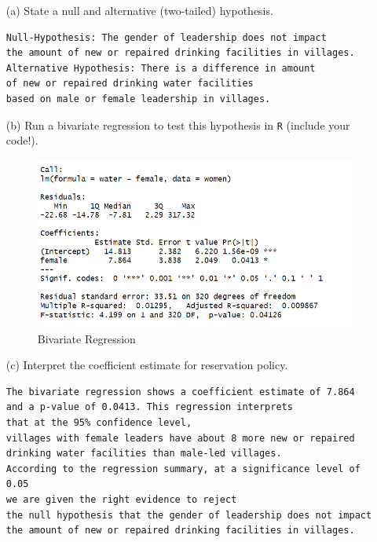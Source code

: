 \documentclass[12pt,letterpaper]{article}
\begin{document}
\newpage
\begin{enumerate}
	\item [(a)] State a null and alternative (two-tailed) hypothesis. 
\begin{Verbatim}
Null-Hypothesis: The gender of leadership does not impact 
the amount of new or repaired drinking facilities in villages.
Alternative Hypothesis: There is a difference in amount 
of new or repaired drinking water facilities 
based on male or female leadership in villages.
\end{Verbatim}
	\item [(b)] Run a bivariate regression to test this hypothesis in \texttt{R} (include your code!).
\begin{figure}[h!]\centering
	\caption{\footnotesize Bivariate Regression}
	\label{fig:bireg}
	\includegraphics[width=.85\textwidth]{bireg.png}
\end{figure}
  
\item [(c)] Interpret the coefficient estimate for reservation policy. 
\begin{Verbatim}
The bivariate regression shows a coefficient estimate of 7.864 
and a p-value of 0.0413. This regression interprets 
that at the 95% confidence level,
villages with female leaders have about 8 more new or repaired 
drinking water facilities than male-led villages. 
According to the regression summary, at a significance level of 0.05 
we are given the right evidence to reject 
the null hypothesis that the gender of leadership does not impact
the amount of new or repaired drinking facilities in villages.
\end{Verbatim}
\end{enumerate}
\end{document}
